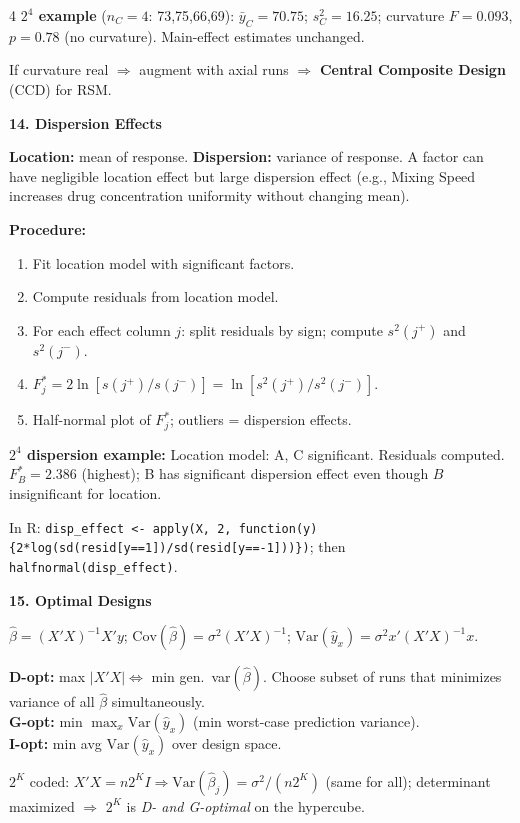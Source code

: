 \documentclass[7pt,letterpaper,landscape]{extarticle}
\newcommand{\secbar}[1]{%
  \vspace{2pt}%
  {\colorbox{black!80}{\parbox{\dimexpr\linewidth-2\fboxsep}{\color{white}\small\bfseries #1}}}\par%
  \vspace{1pt}%
}
\begin{document}
\begin{multicols*}{4}
\textbf{$2^4$ example} ($n_C{=}4$: 73,75,66,69):
$\bar y_C{=}70.75$; $s_C^2{=}16.25$; curvature $F{=}0.093$, $p{=}0.78$ (no curvature). Main-effect estimates unchanged.

If curvature real $\Rightarrow$ augment with axial runs $\Rightarrow$ \textbf{Central Composite Design} (CCD) for RSM.

\secbar{14. Dispersion Effects}
\textbf{Location:} mean of response. \textbf{Dispersion:} variance of response. A factor can have negligible location effect but large dispersion effect (e.g., Mixing Speed increases drug concentration uniformity without changing mean).

\textbf{Procedure:}
\begin{enumerate}[leftmargin=10pt]
\item Fit location model with significant factors.
\item Compute residuals from location model.
\item For each effect column $j$: split residuals by sign; compute $s^2(j^+)$ and $s^2(j^-)$.
\item $F_j^*{=}2\ln[s(j^+)/s(j^-)]{=}\ln[s^2(j^+)/s^2(j^-)]$.
\item Half-normal plot of $F_j^*$; outliers = dispersion effects.
\end{enumerate}

\textbf{$2^4$ dispersion example:} Location model: A, C significant. Residuals computed. $F_B^*{=}2.386$ (highest); B has significant dispersion effect even though $B$ insignificant for location.

In R: \texttt{disp\_effect <- apply(X, 2, function(y)\{2*log(sd(resid[y==1])/sd(resid[y==-1]))\})}; then \texttt{halfnormal(disp\_effect)}.

\secbar{15. Optimal Designs}
$\hat\beta{=}(X'X)^{-1}X'y$; $\mathrm{Cov}(\hat\beta){=}\sigma^2(X'X)^{-1}$; $\mathrm{Var}(\hat y_x){=}\sigma^2 x'(X'X)^{-1}x$.

\textbf{D-opt:} max $|X'X|\Leftrightarrow$ min gen.\ var$(\hat\beta)$. Choose subset of runs that minimizes variance of all $\hat\beta$ simultaneously.\\
\textbf{G-opt:} min $\max_x\mathrm{Var}(\hat y_x)$ (min worst-case prediction variance).\\
\textbf{I-opt:} min avg $\mathrm{Var}(\hat y_x)$ over design space.

$2^K$ coded: $X'X{=}n2^K I\Rightarrow\mathrm{Var}(\hat\beta_j){=}\sigma^2/(n2^K)$ (same for all); determinant maximized $\Rightarrow$ $2^K$ is \emph{D- and G-optimal} on the hypercube.


\end{multicols*}
\end{document}

